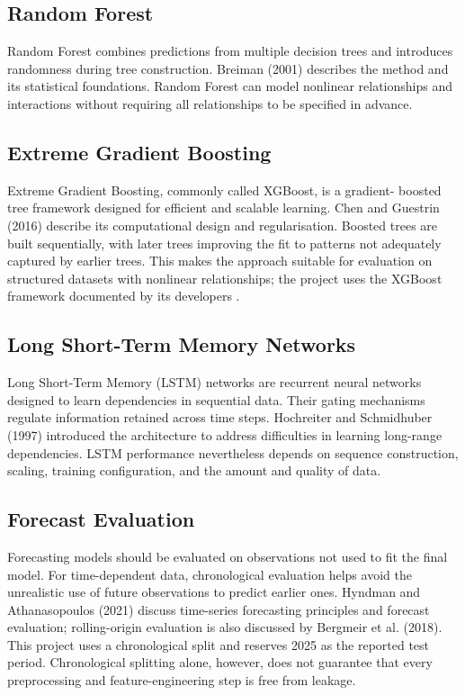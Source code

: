 \documentclass[12pt,a4paper]{article}
\begin{document}
	\subsection{Random Forest}
	
	Random Forest combines predictions from multiple decision trees
	and introduces randomness during tree construction. Breiman (2001)\cite{breiman2001}
	describes the method and its statistical foundations. Random Forest
	can model nonlinear relationships and interactions without requiring
	all relationships to be specified in advance.
	
	\subsection{Extreme Gradient Boosting}
	
	Extreme Gradient Boosting, commonly called XGBoost, is a gradient-
	boosted tree framework designed for efficient and scalable learning.
	Chen and Guestrin (2016)\cite{chen2016} describe its computational design and
	regularisation. Boosted trees are built sequentially, with later
	trees improving the fit to patterns not adequately captured by
	earlier trees. This makes the approach suitable for evaluation on
	structured datasets with nonlinear relationships; the project uses the
	XGBoost framework documented by its developers \cite{xgboostdocs}.
	
	\subsection{Long Short-Term Memory Networks}
	
	Long Short-Term Memory (LSTM) networks are recurrent neural networks
	designed to learn dependencies in sequential data. Their gating
	mechanisms regulate information retained across time steps.
	Hochreiter and Schmidhuber (1997)\cite{hochreiter1997} introduced the architecture to
	address difficulties in learning long-range dependencies. LSTM
	performance nevertheless depends on sequence construction, scaling,
	training configuration, and the amount and quality of data.
	
	\subsection{Forecast Evaluation}
	
	Forecasting models should be evaluated on observations not used to
	fit the final model. For time-dependent data, chronological
	evaluation helps avoid the unrealistic use of future observations
	to predict earlier ones. Hyndman and Athanasopoulos (2021)\cite{hyndman2021} discuss
	time-series forecasting principles and forecast evaluation; rolling-origin evaluation is also discussed by Bergmeir et al. (2018)\cite{bergmeir2018}. This
	project uses a chronological split and reserves 2025 as the reported
	test period. Chronological splitting alone, however, does not
	guarantee that every preprocessing and feature-engineering step is
	free from leakage.
	
\end{document}
